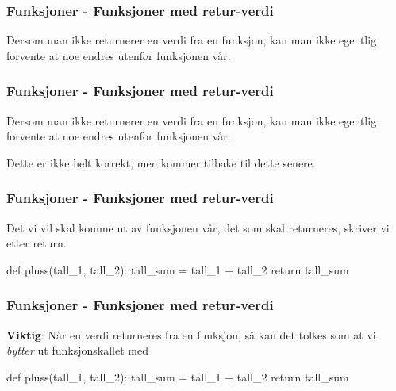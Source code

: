 
\begin{frame}
    \frametitle{Funksjoner - Funksjoner med retur-verdi}

    Dersom man ikke returnerer en verdi fra en funksjon, kan man ikke egentlig forvente at noe endres utenfor funksjonen vår. 

\end{frame}

\begin{frame}
    \frametitle{Funksjoner - Funksjoner med retur-verdi}

    Dersom man ikke returnerer en verdi fra en funksjon, kan man ikke egentlig forvente at noe endres utenfor funksjonen vår. 

    Dette er ikke helt korrekt, men kommer tilbake til dette senere. 

\end{frame}

\begin{frame}[fragile]
    \frametitle{Funksjoner - Funksjoner med retur-verdi}

    Det vi vil skal komme ut av funksjonen vår, det som skal returneres, skriver vi etter return. 

\begin{python}
def pluss(tall_1, tall_2):
    tall_sum = tall_1 + tall_2
    return tall_sum
\end{python}

\end{frame}

\begin{frame}[fragile]
    \frametitle{Funksjoner - Funksjoner med retur-verdi}

    \textbf{Viktig}: Når en verdi returneres fra en funksjon, så kan det tolkes som at vi \textit{bytter} ut funksjonskallet med 

\begin{python}
def pluss(tall_1, tall_2):
    tall_sum = tall_1 + tall_2
    return tall_sum
\end{python}

\end{frame}